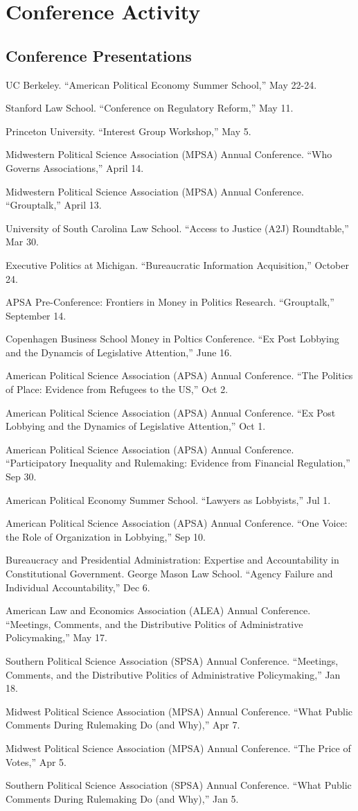 \documentclass[12pt,letterpaper]{report}
\newcommand{\talk}[4]{\item[#1]{\tab{}#3. \enquote{#2,} #4.}} %
\newcommand{\APSA}{American Political Science Association (APSA) Annual Conference}
\newcommand{\MPSA}{Midwestern Political Science Association (MPSA) Annual Conference}
\begin{document}
    \section*{Conference Activity}
    
    \subsection*{Conference Presentations}
    \begin{tablist}
    \talk{2024}{American Political Economy Summer School}{UC Berkeley}{May 22-24}
    \talk{2023}{Conference on Regulatory Reform}{Stanford Law School}{May 11}
    \talk{2023}{Interest Group Workshop}{Princeton University}{May 5}
	\talk{2023}{Who Governs Associations}{\MPSA}{April 14}
	\talk{2023}{Grouptalk}{\MPSA}{April 13} 
    \talk{2023}{Access to Justice (A2J) Roundtable}{University of South Carolina Law School}{Mar 30}
	\talk{2022}{Bureaucratic Information Acquisition}{Executive Politics at Michigan}{October 24}
	\talk{2022}{Grouptalk}{APSA Pre-Conference: Frontiers in Money in Politics Research}{September 14}
    \talk{2022}{Ex Post Lobbying and the Dynamcis of Legislative Attention}{Copenhagen Business School Money in Poltics Conference}{June 16}
    \talk{2021}{The Politics of Place: Evidence from Refugees to the US}{\APSA}{Oct 2}
    \talk{2021}{Ex Post Lobbying and the Dynamics of Legislative Attention}{\APSA}{Oct 1}
    \talk{2021}{Participatory Inequality and Rulemaking: Evidence from Financial Regulation}{\APSA}{Sep 30}
    \talk{2021}{Lawyers as Lobbyists}{American Political Economy Summer School}{Jul 1}
    \talk{2020}{One Voice: the Role of Organization in Lobbying}{\APSA}{Sep 10}
    \talk{2019}{Agency Failure and Individual Accountability}{Bureaucracy and Presidential Administration: Expertise and Accountability in Constitutional Government. George Mason Law School}{Dec 6}
    \talk{2019}{Meetings, Comments, and the Distributive Politics of Administrative Policymaking}{American Law and Economics Association (ALEA) Annual Conference}{May 17}
    \talk{2019}{Meetings, Comments, and the Distributive Politics of Administrative Policymaking}{Southern Political Science Association (SPSA) Annual Conference}{Jan 18} 
    \talk{2018}{What Public Comments During Rulemaking Do (and Why)}{Midwest Political Science Association (MPSA) Annual Conference}{Apr 7}
    \talk{2018}{The Price of Votes}{Midwest Political Science Association (MPSA) Annual Conference}{Apr 5}
    \talk{2018}{What Public Comments During Rulemaking Do (and Why)}{Southern Political Science Association (SPSA) Annual Conference}{Jan 5} 

\end{tablist}
\end{document}
